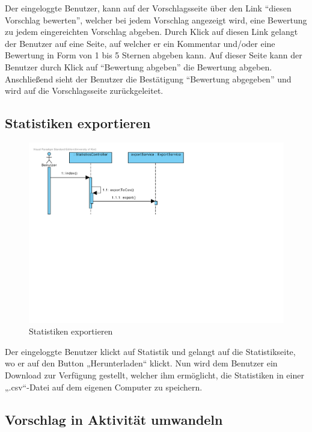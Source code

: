 Der eingeloggte Benutzer, kann auf der Vorschlagsseite über den Link
``diesen Vorschlag bewerten'', welcher bei jedem Vorschlag angezeigt
wird, eine Bewertung zu jedem eingereichten Vorschlag abgeben. Durch
Klick auf diesen Link gelangt der Benutzer auf eine Seite, auf welcher
er ein Kommentar und/oder eine Bewertung in Form von 1 bis 5 Sternen
abgeben kann. Auf dieser Seite kann der Benutzer durch Klick auf
 ``Bewertung abgeben'' die Bewertung abgeben. Anschließend sieht
 der Benutzer die Bestätigung ``Bewertung abgegeben'' und wird auf die Vorschlagsseite zurückgeleitet.
 

\subsection{Statistiken exportieren}

\begin{figure}[H]
  \centering
  \includegraphics[width=\textwidth, trim= 1cm 12cm 11cm 1cm, clip]{gfx/statistiken_exportieren}
  \caption{Statistiken exportieren}
\end{figure}

Der eingeloggte Benutzer klickt auf Statistik und gelangt auf die
Statistikseite, wo er auf den Button „Herunterladen“ klickt. Nun wird
dem Benutzer ein Download zur Verfügung gestellt, welcher ihm
ermöglicht, die Statistiken in einer „.csv“-Datei auf dem eigenen
Computer zu speichern.

\subsection{Vorschlag in Aktivität umwandeln}


